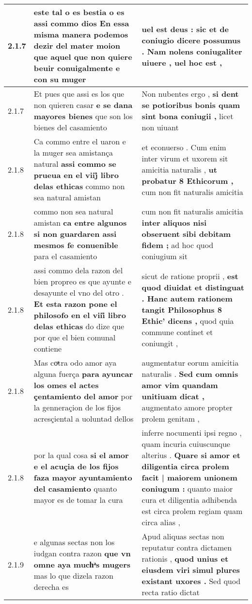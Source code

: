\begin{tabular}{|p{1cm}|p{6.5cm}|p{6.5cm}|}
2.1.7 & este tal o es bestia o es assi commo dios \textbf{ En essa misma manera podemos dezir del mater moion } que aquel que non quiere beuir conuigalmente e con su muger & uel est deus : \textbf{ sic et de coniugio dicere possumus . Nam nolens coniugaliter uiuere , } uel hoc est , \\\hline
2.1.7 & Et pues que assi es los que non quieren casar \textbf{ e se dana mayores bienes } que son los bienes del casamiento & Non nubentes ergo , \textbf{ si dent se potioribus bonis quam sint bona coniugii , } licet non uiuant \\\hline
2.1.8 & Ca commo entre el uaron e la muger sea amistança natural \textbf{ assi commo se prueua en el viij̊ libro delas ethicas } commo non sea natural amistan & et econuerso . Cum enim inter virum et uxorem sit amicitia naturalis , \textbf{ ut probatur 8 Ethicorum , } cum non fit naturalis amicitia \\\hline
2.1.8 & commo non sea natural amistan \textbf{ ca entre algunos si non guardaren assi mesmos fe conuenible } para el casamiento & cum non fit naturalis amicitia \textbf{ inter aliquos nisi obseruent sibi debitam fidem ; } ad hoc quod coniugium sit \\\hline
2.1.8 & assi commo dela razon del bien propreo es que ayunte e desayunte el vno del otro . \textbf{ Et esta razon pone el philosofo en el viii̊ libro delas ethicas } do dize que por que el bien comunal contiene & sicut de ratione proprii , \textbf{ est quod diuidat et distinguat . Hanc autem rationem tangit Philosophus 8 Ethic’ dicens , } quod quia commune continet et coniungit , \\\hline
2.1.8 & Mas coͣtra odo amor aya alguna fuerça \textbf{ para ayuncar los omes el actes çentamiento del amor } por la genneraçion de los fijos acresçiental a uoluntad dellos & augmentatur eorum amicitia naturalis . \textbf{ Sed cum omnis amor vim quandam unitiuam dicat , } augmentato amore propter prolem genitam , \\\hline
2.1.8 & por la qual cosa \textbf{ si el amor e el acuçia de los fijos faza mayor ayuntamiento del casamiento } quanto mayor es de tomar la cura & inferre nocumenti ipsi regno , quam incuria cuiuscunque alterius . \textbf{ Quare si amor et diligentia circa prolem facit | maiorem unionem coniugum : } quanto maior cura et diligentia adhibenda est circa prolem regiam quam circa alias , \\\hline
2.1.9 & e algunas sectas non los iudgan contra razon \textbf{ que vn omne aya muchͣs mugers } mas lo que dizela razon derecha es & Apud aliquas sectas non reputatur contra dictamen rationis , \textbf{ quod unius et eiusdem viri simul plures existant uxores . } Sed quod recta ratio dictat \\\hline

\end{tabular}
